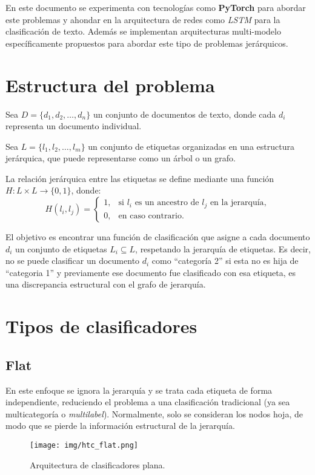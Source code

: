 \documentclass[12pt,letterpaper]{article}
\begin{document}
En este documento se experimenta con tecnologías como \textbf{PyTorch} para abordar este problemas y ahondar en la arquitectura de redes como \textit{LSTM} para la clasificación de texto. Además se implementan arquitecturas multi-modelo específicamente propuestos para abordar este tipo de problemas jerárquicos.

\section{Estructura del problema}

Sea \( D = \{d_1, d_2, \dots, d_n\} \) un conjunto de documentos de texto, donde cada \( d_i \) representa un documento individual.

Sea \( L = \{l_1, l_2, \dots, l_m\} \) un conjunto de etiquetas organizadas en una estructura jerárquica, que puede representarse como un árbol o un grafo.

La relación jerárquica entre las etiquetas se define mediante una función \( H: L \times L \rightarrow \{0, 1\} \), donde:
\[
    H(l_i, l_j) =
    \begin{cases}
        1, & \text{si } l_i \text{ es un ancestro de } l_j \text{ en la jerarquía}, \\
        0, & \text{en caso contrario}.
    \end{cases}
\]

El objetivo es encontrar una función de clasificación que asigne a cada documento \( d_i \) un conjunto de etiquetas \( L_i \subseteq L \), respetando la jerarquía de etiquetas. Es decir, no se puede clasificar un documento $d_i$ como ``categoría 2'' si esta no es hija de ``categoria 1'' y previamente ese documento fue clasificado con esa etiqueta, es una discrepancia estructural con el grafo de jerarquía.

\section{Tipos de clasificadores}
\subsection{Flat}
En este enfoque se ignora la jerarquía y se trata cada etiqueta de forma independiente, reduciendo el problema a una clasificación tradicional (ya sea multicategoría o \textit{multilabel}). Normalmente, solo se consideran los nodos hoja, de modo que se pierde la información estructural de la jerarquía.

\begin{figure}[htp]
    \centering
    \texttt{[image: img/htc\_flat.png]}
    \caption{Arquitectura de clasificadores plana.}
    \label{fig:htc_flat}
\end{figure}
\end{document}
